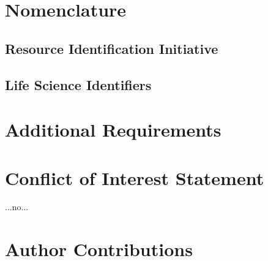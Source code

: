 \documentclass[utf8]{frontiersSCNS} %
\begin{document}
\section*{Nomenclature}

\subsection*{Resource Identification Initiative}

\subsection*{Life Science Identifiers}

\section*{Additional Requirements}

\section*{Conflict of Interest Statement}
...no...

\section*{Author Contributions}
\end{document}
